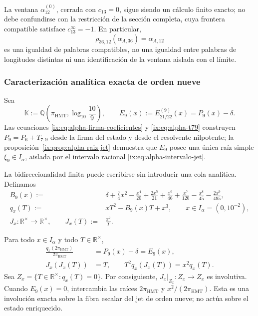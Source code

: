 La ventana \(\alpha_{12}^{(0)}\), cerrada con \(c_{13}=0\), sigue siendo un
cálculo finito exacto; no debe confundirse con la restricción de la sección
completa, cuya frontera compatible satisface \(c_{13}^{\infty}=-1\). En
particular,
\begin{equation}
 \rho_{36,12}(\alpha_{A,36})=\alpha_{A,12}
 \label{ix:eq:alpha-rho-36-12-proyectiva}
\end{equation}
es una igualdad de palabras compatibles, no una igualdad entre palabras de
longitudes distintas ni una identificación de la ventana aislada con el
límite.

\subsubsection{Caracterización analítica exacta de orden nueve}

Sea
\[
 \mathbb K:=\mathbb Q\!\left(\pi_{\mathrm{HMT}},
                  \log_{10}\frac{10}{9}\right),
 \qquad
 E_9(x):=E_{21/22}^{(9)}(x)=P_9(x)-\delta .
\]
Las ecuaciones \eqref{ix:eq:alpha-firma-coeficientes} y
\eqref{ix:eq:alpha-t79} construyen \(P_9=P_6+T_{7:9}\) desde la firma del
estado y desde el resolvente nilpotente; la
proposición~\ref{ix:prop:alpha-raiz-jet} demuestra que \(E_9\) posee una única
raíz simple \(\xi_9\in I_\alpha\), aislada por el intervalo racional
\eqref{ix:eq:alpha-intervalo-jet}.

La bidireccionalidad finita puede escribirse sin introducir una cola
analítica. Definamos
\begin{align}
 B_9(x):={}&\delta+\frac74x^2-\frac{x^4}{20}
 +\frac{2x^5}{21}+\frac{x^6}{46}+\frac{x^7}{120}
 -\frac{x^8}{45}-\frac{2x^9}{495},
 \label{ix:eq:alpha-b9-finito}\\
 q_x(T):={}&xT^2-B_9(x)T+x^3,\qquad x\in I_\alpha=(0,10^{-2}),
 \label{ix:eq:alpha-q-involucion-finita}\\
 J_x:{\mathbb R}^{\times}\longrightarrow{\mathbb R}^{\times},
 \qquad J_x(T):={}&\frac{x^2}{T}.
\end{align}

\begin{proposition}
\label{ix:prop:alpha-involucion-finita-exacta}
Para todo \(x\in I_\alpha\) y todo \(T\in\mathbb R^\times\),
\begin{align}
 \frac{q_x(2\pi_{\mathrm{HMT}})}{2\pi_{\mathrm{HMT}}}
 &=P_9(x)-\delta=E_9(x),
 \label{ix:eq:alpha-q-equivale-p9}\\
 J_x(J_x(T))&=T,
 \qquad
 T^2q_x(J_x(T))=x^2q_x(T).
 \label{ix:eq:alpha-j-involucion-exacta}
\end{align}
Sea \(Z_x=\{T\in\mathbb R^\times:q_x(T)=0\}\). Por consiguiente,
\(J_x|_{Z_x}:Z_x\to Z_x\) es involutiva. Cuando \(E_9(x)=0\),
intercambia las raíces \(2\pi_{\mathrm{HMT}}\) y
\(x^2/(2\pi_{\mathrm{HMT}})\). Esta es una involución exacta sobre la fibra
escalar del jet de orden nueve; no actúa sobre el estado enriquecido.
\end{proposition}

